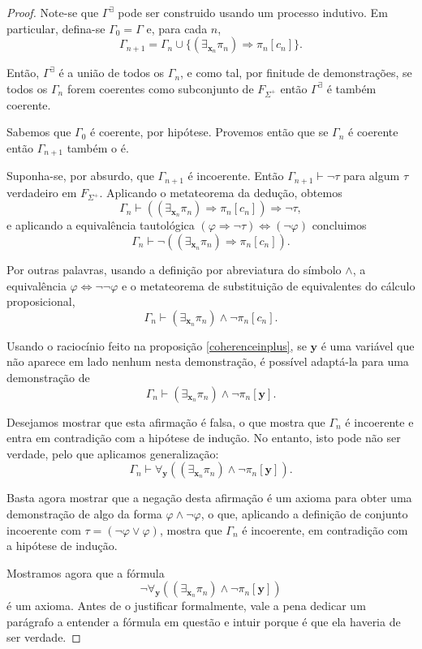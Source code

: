 \documentclass{report}
\theoremstyle{definition}
\theoremstyle{remark}
\renewcommand{\bf}[1]{\mathbf{#1}}
\newcommand{\imply}{\mathbin{\Rightarrow}}
\newcommand{\eqv}{\mathbin{\Leftrightarrow}}
\begin{document}
	\begin{proof}
	Note-se que $\Gamma^\exists$ pode ser construido usando um processo indutivo. Em particular, defina-se $\Gamma_0 = \Gamma$ e, para cada $n$,
	\[\Gamma_{n+1} = \Gamma_n \cup \{(\exists_{\bf x_n} \pi_n) \imply \pi_n[c_n]\}.\]
	
	Então, $\Gamma^\exists$ é a união de todos os $\Gamma_n$, e como tal, por finitude de demonstrações, se todos os $\Gamma_n$ forem coerentes como subconjunto de $F_{\Sigma^+}$ então $\Gamma^\exists$ é também coerente.
	
	Sabemos que $\Gamma_0$ é coerente, por hipótese. Provemos então que se $\Gamma_n$ é coerente então $\Gamma_{n+1}$ também o é.
	
	Suponha-se, por absurdo, que $\Gamma_{n+1}$ é incoerente. Então $\Gamma_{n+1} \vdash \neg \tau$ para algum $\tau$ verdadeiro em $F_{\Sigma^+}$. Aplicando o metateorema da dedução, obtemos
	\[\Gamma_n \vdash ((\exists_{\bf x_n} \pi_n) \imply \pi_n[c_n]) \imply \neg \tau,\]
	e aplicando a equivalência tautológica $(\varphi \imply \neg \tau) \eqv (\neg \varphi)$ concluimos
	\[\Gamma_n \vdash \neg ((\exists_{\bf x_n} \pi_n) \imply \pi_n[c_n]).\]
	
	Por outras palavras, usando a definição por abreviatura do símbolo $\land$, a equivalência $\varphi \eqv \neg \neg \varphi$ e o metateorema de substituição de equivalentes do cálculo proposicional,
	\[\Gamma_n \vdash (\exists_{\bf x_n} \pi_n) \land \neg \pi_n[c_n].\]
	
	Usando o raciocínio feito na proposição \ref{coherenceinplus}, se $\bf y$ é uma variável que não aparece em lado nenhum nesta demonstração, é possível adaptá-la para uma demonstração de
	\[\Gamma_n \vdash (\exists_{\bf x_n} \pi_n) \land \neg \pi_n[\bf y].\]
	
	Desejamos mostrar que esta afirmação é falsa, o que mostra que $\Gamma_n$ é incoerente e entra em contradição com a hipótese de indução. No entanto, isto pode não ser verdade, pelo que aplicamos generalização:
	\[\Gamma_n \vdash \forall_{\bf y}((\exists_{\bf x_n} \pi_n) \land \neg \pi_n[\bf y]).\]
	
	Basta agora mostrar que a negação desta afirmação é um axioma para obter uma demonstração de algo da forma $\varphi \land \neg \varphi$, o que, aplicando a definição de conjunto incoerente com $\tau = (\neg \varphi \lor \varphi)$, mostra que $\Gamma_n$ é incoerente, em contradição com a hipótese de indução.
	
	Mostramos agora que a fórmula
	\[\neg \forall_{\bf y}((\exists_{\bf x_n} \pi_n) \land \neg \pi_n[\bf y])\]
	é um axioma. Antes de o justificar formalmente, vale a pena dedicar um parágrafo a entender a fórmula em questão e intuir porque é que ela haveria de ser verdade.
	

\end{proof}
\end{document}
